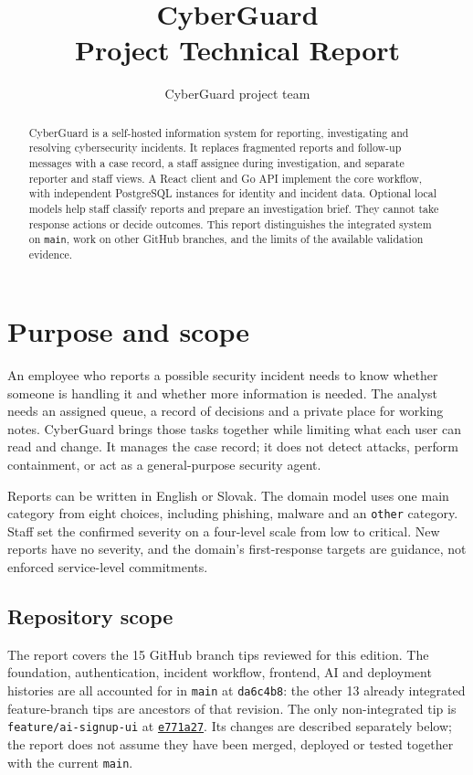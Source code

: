 \documentclass[11pt,a4paper]{article}
\title{\textbf{CyberGuard}\\[0.5em]\Large Project Technical Report}
\author{CyberGuard project team}
\date{}
\newcommand{\signuprevision}{e771a276aaf944f29ecfceb84d1276842f68055f}
\newcommand{\project}{https://github.com/bekadoux/cyberguard}
\newcommand{\code}[1]{\texttt{#1}}
\newcommand{\route}[1]{\nolinkurl{#1}}
\begin{document}
\maketitle

\begin{abstract}
CyberGuard is a self-hosted information system for reporting, investigating
and resolving cybersecurity incidents. It replaces fragmented reports and
follow-up messages with a case record, a staff assignee during investigation,
and separate reporter and staff views. A React client and Go API implement the
core workflow, with independent PostgreSQL instances for identity and incident
data. Optional local models help staff classify reports and prepare an
investigation brief. They cannot take response actions or decide outcomes.
This report distinguishes the integrated system on \code{main}, work on
other GitHub branches, and the limits of the available validation evidence.
\end{abstract}

{\small\tableofcontents}
\clearpage

\section{Purpose and scope}

An employee who reports a possible security incident needs to know whether
someone is handling it and whether more information is needed. The analyst
needs an assigned queue, a record of decisions and a private place for working
notes. CyberGuard brings those tasks together while limiting what each user
can read and change. It manages the case record; it does not detect attacks,
perform containment, or act as a general-purpose security agent.

Reports can be written in English or Slovak. The domain model uses one main
category from eight choices, including phishing, malware and an \code{other}
category. Staff set the confirmed severity on a four-level scale from low to
critical. New reports have no severity, and the domain's first-response
targets are guidance, not enforced service-level commitments.

\subsection{Repository scope}

The report covers the 15 GitHub branch tips reviewed for this edition.
The foundation, authentication, incident workflow, frontend, AI and
deployment histories are all accounted for in \code{main} at
\code{da6c4b8}: the other 13 already integrated feature-branch tips are
ancestors of that revision. The only non-integrated tip is
\route{feature/ai-signup-ui} at
\href{\project/commit/\signuprevision}{\code{e771a27}}. Its changes are
described separately below; the report does not assume they have been
merged, deployed or tested together with the current \code{main}.
\end{document}
